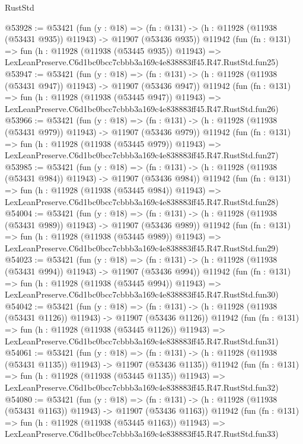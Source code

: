\begin{lexlean}{RustStd}
\begin{coremodule}
@53928 := @53421
    (fun (y : @18) =>
    (fn : @131) -> (h : @11928 (@11938 (@53431 @935)) @11943) -> @11907 (@53436 @935))
    @11942
    (fun (fn : @131) =>
    fun (h : @11928 (@11938 (@53445 @935)) @11943) =>
    LexLeanPreserve.C6d1bc0bcc7cbbb3a169c4e838883ff45.R47.RustStd.fun25)
@53947 := @53421
    (fun (y : @18) =>
    (fn : @131) -> (h : @11928 (@11938 (@53431 @947)) @11943) -> @11907 (@53436 @947))
    @11942
    (fun (fn : @131) =>
    fun (h : @11928 (@11938 (@53445 @947)) @11943) =>
    LexLeanPreserve.C6d1bc0bcc7cbbb3a169c4e838883ff45.R47.RustStd.fun26)
@53966 := @53421
    (fun (y : @18) =>
    (fn : @131) -> (h : @11928 (@11938 (@53431 @979)) @11943) -> @11907 (@53436 @979))
    @11942
    (fun (fn : @131) =>
    fun (h : @11928 (@11938 (@53445 @979)) @11943) =>
    LexLeanPreserve.C6d1bc0bcc7cbbb3a169c4e838883ff45.R47.RustStd.fun27)
@53985 := @53421
    (fun (y : @18) =>
    (fn : @131) -> (h : @11928 (@11938 (@53431 @984)) @11943) -> @11907 (@53436 @984))
    @11942
    (fun (fn : @131) =>
    fun (h : @11928 (@11938 (@53445 @984)) @11943) =>
    LexLeanPreserve.C6d1bc0bcc7cbbb3a169c4e838883ff45.R47.RustStd.fun28)
@54004 := @53421
    (fun (y : @18) =>
    (fn : @131) -> (h : @11928 (@11938 (@53431 @989)) @11943) -> @11907 (@53436 @989))
    @11942
    (fun (fn : @131) =>
    fun (h : @11928 (@11938 (@53445 @989)) @11943) =>
    LexLeanPreserve.C6d1bc0bcc7cbbb3a169c4e838883ff45.R47.RustStd.fun29)
@54023 := @53421
    (fun (y : @18) =>
    (fn : @131) -> (h : @11928 (@11938 (@53431 @994)) @11943) -> @11907 (@53436 @994))
    @11942
    (fun (fn : @131) =>
    fun (h : @11928 (@11938 (@53445 @994)) @11943) =>
    LexLeanPreserve.C6d1bc0bcc7cbbb3a169c4e838883ff45.R47.RustStd.fun30)
@54042 := @53421
    (fun (y : @18) =>
    (fn : @131) -> (h : @11928 (@11938 (@53431 @1126)) @11943) -> @11907 (@53436 @1126))
    @11942
    (fun (fn : @131) =>
    fun (h : @11928 (@11938 (@53445 @1126)) @11943) =>
    LexLeanPreserve.C6d1bc0bcc7cbbb3a169c4e838883ff45.R47.RustStd.fun31)
@54061 := @53421
    (fun (y : @18) =>
    (fn : @131) -> (h : @11928 (@11938 (@53431 @1135)) @11943) -> @11907 (@53436 @1135))
    @11942
    (fun (fn : @131) =>
    fun (h : @11928 (@11938 (@53445 @1135)) @11943) =>
    LexLeanPreserve.C6d1bc0bcc7cbbb3a169c4e838883ff45.R47.RustStd.fun32)
@54080 := @53421
    (fun (y : @18) =>
    (fn : @131) -> (h : @11928 (@11938 (@53431 @1163)) @11943) -> @11907 (@53436 @1163))
    @11942
    (fun (fn : @131) =>
    fun (h : @11928 (@11938 (@53445 @1163)) @11943) =>
    LexLeanPreserve.C6d1bc0bcc7cbbb3a169c4e838883ff45.R47.RustStd.fun33)

\end{coremodule}
\end{lexlean}
